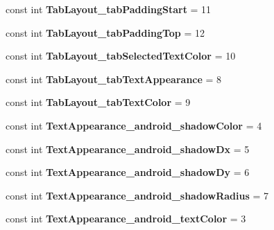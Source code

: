 \begin{DoxyCompactItemize}
const int {\bfseries Tab\+Layout\+\_\+tab\+Padding\+Start} = 11
\item 
\mbox{\label{classXaria_1_1Resource_1_1Styleable_a58d6172612ed1484cc80f5ce75c2a0e4}} 
const int {\bfseries Tab\+Layout\+\_\+tab\+Padding\+Top} = 12
\item 
\mbox{\label{classXaria_1_1Resource_1_1Styleable_a5f7bfcc012a9ed6a381cf38771939d4e}} 
const int {\bfseries Tab\+Layout\+\_\+tab\+Selected\+Text\+Color} = 10
\item 
\mbox{\label{classXaria_1_1Resource_1_1Styleable_a7c6b81520c2e5120cc2651bf0f3523cf}} 
const int {\bfseries Tab\+Layout\+\_\+tab\+Text\+Appearance} = 8
\item 
\mbox{\label{classXaria_1_1Resource_1_1Styleable_ae380282f9c6e677b619cdd1cc4021c81}} 
const int {\bfseries Tab\+Layout\+\_\+tab\+Text\+Color} = 9
\item 
\mbox{\label{classXaria_1_1Resource_1_1Styleable_aeea190e87af2befa9d087f263ffef5e5}} 
const int {\bfseries Text\+Appearance\+\_\+android\+\_\+shadow\+Color} = 4
\item 
\mbox{\label{classXaria_1_1Resource_1_1Styleable_a9c0ab3b46feb3949852111e4dbb1b34f}} 
const int {\bfseries Text\+Appearance\+\_\+android\+\_\+shadow\+Dx} = 5
\item 
\mbox{\label{classXaria_1_1Resource_1_1Styleable_a8322e6ddecec046ae5f1e5f4d5327cf1}} 
const int {\bfseries Text\+Appearance\+\_\+android\+\_\+shadow\+Dy} = 6
\item 
\mbox{\label{classXaria_1_1Resource_1_1Styleable_a58f192890b38f2c966fb93124402dba0}} 
const int {\bfseries Text\+Appearance\+\_\+android\+\_\+shadow\+Radius} = 7
\item 
\mbox{\label{classXaria_1_1Resource_1_1Styleable_a466607e8684b3775f9e5a10caef9564f}} 
const int {\bfseries Text\+Appearance\+\_\+android\+\_\+text\+Color} = 3

\end{DoxyCompactItemize}
